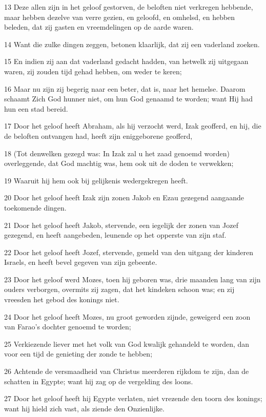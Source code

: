 \par 13 Deze allen zijn in het geloof gestorven, de beloften niet verkregen hebbende, maar hebben dezelve van verre gezien, en geloofd, en omhelsd, en hebben beleden, dat zij gasten en vreemdelingen op de aarde waren.
\par 14 Want die zulke dingen zeggen, betonen klaarlijk, dat zij een vaderland zoeken.
\par 15 En indien zij aan dat vaderland gedacht hadden, van hetwelk zij uitgegaan waren, zij zouden tijd gehad hebben, om weder te keren;
\par 16 Maar nu zijn zij begerig naar een beter, dat is, naar het hemelse. Daarom schaamt Zich God hunner niet, om hun God genaamd te worden; want Hij had hun een stad bereid.
\par 17 Door het geloof heeft Abraham, als hij verzocht werd, Izak geofferd, en hij, die de beloften ontvangen had, heeft zijn eniggeborene geofferd,
\par 18 (Tot denwelken gezegd was: In Izak zal u het zaad genoemd worden) overleggende, dat God machtig was, hem ook uit de doden te verwekken;
\par 19 Waaruit hij hem ook bij gelijkenis wedergekregen heeft.
\par 20 Door het geloof heeft Izak zijn zonen Jakob en Ezau gezegend aangaande toekomende dingen.
\par 21 Door het geloof heeft Jakob, stervende, een iegelijk der zonen van Jozef gezegend, en heeft aangebeden, leunende op het opperste van zijn staf.
\par 22 Door het geloof heeft Jozef, stervende, gemeld van den uitgang der kinderen Israels, en heeft bevel gegeven van zijn gebeente.
\par 23 Door het geloof werd Mozes, toen hij geboren was, drie maanden lang van zijn ouders verborgen, overmits zij zagen, dat het kindeken schoon was; en zij vreesden het gebod des konings niet.
\par 24 Door het geloof heeft Mozes, nu groot geworden zijnde, geweigerd een zoon van Farao's dochter genoemd te worden;
\par 25 Verkiezende liever met het volk van God kwalijk gehandeld te worden, dan voor een tijd de genieting der zonde te hebben;
\par 26 Achtende de versmaadheid van Christus meerderen rijkdom te zijn, dan de schatten in Egypte; want hij zag op de vergelding des loons.
\par 27 Door het geloof heeft hij Egypte verlaten, niet vrezende den toorn des konings; want hij hield zich vast, als ziende den Onzienlijke.
